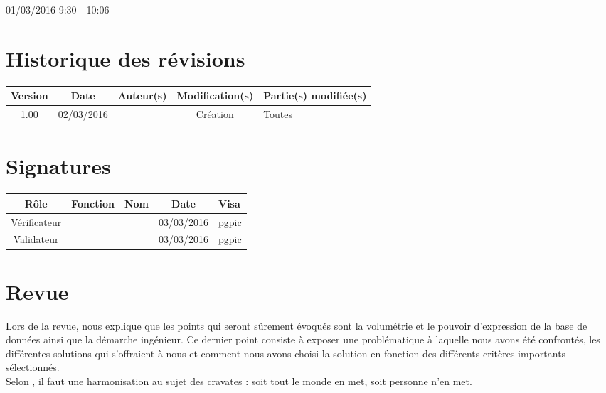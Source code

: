 \documentclass [a4paper] {article}
\begin{document}
\rhead{}

01/03/2016
\hfill   
\hfill 	9:30 - 10:06 				%



\section*{Historique des révisions}
\begin{center}
			\begin{tabular}{| c | c | c | c | p{4cm} |}
				\hline
				\rowcolor{Gray}
				Version & Date & Auteur(s) & Modification(s) & Partie(s) modifiée(s)		 \\
				\hline
				1.00 & 02/03/2016 & \Pierre & Création & Toutes \\
		\hline		
			\end{tabular}
		\end{center}

\section*{Signatures}

		\begin{center}
			\begin{tabular}{| c | c | c | c | p{4cm} |}
				\hline
				\rowcolor{Gray}
				Rôle & Fonction & Nom & Date & Visa		 \\
				\hline
				Vérificateur & \RQA & \Kafui & 03/03/2016 & pgpic \\[30pt]
				\hline
				Validateur & \CP & \Sergi & 03/03/2016 & pgpic \\[30pt]	
				\hline
			\end{tabular}
		\end{center}


\section{Revue}
Lors de la revue, \nomTuteurQualite{} nous explique que les points qui seront sûrement évoqués sont la volumétrie et le pouvoir d'expression de la base de données ainsi que la démarche ingénieur. Ce dernier point consiste à exposer une problématique à laquelle nous avons été confrontés, les différentes solutions qui s'offraient à nous et comment nous avons choisi la solution en fonction des différents critères importants sélectionnés.\\
Selon \nomTuteurQualite{}, il faut une harmonisation au sujet des cravates : soit tout le monde en met, soit personne n'en met.
\end{document}
